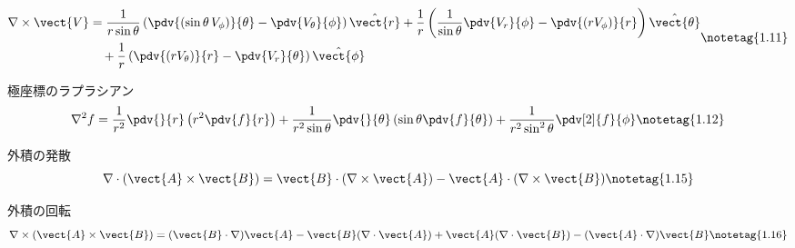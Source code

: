 \documentclass[uplatex,dvipdfmx,a4paper,11pt]{jsarticle}
\begin{document}
\begin{noteshikilist}
    \[ \begin{aligned}
      \nabla\times\vect{V} &= \frac{1}{r\sin\theta}\left(\pdv{(\sin\theta\,V_\phi)}{\theta} - \pdv{V_\theta}{\phi}\right)\hat{\vect{r}} + \frac{1}{r}\left(\frac{1}{\sin\theta}\pdv{V_r}{\phi} - \pdv{(rV_\phi)}{r}\right)\hat{\vect{\theta}} \\
      &\quad + \frac{1}{r}\left(\pdv{(rV_\theta)}{r} - \pdv{V_r}{\theta}\right)\hat{\vect{\phi}}
    \end{aligned} \notetag{1.11} \]
  \item 極座標のラプラシアン %
    \[ \nabla^2 f = \frac{1}{r^2}\pdv{}{r}\left(r^2\pdv{f}{r}\right) + \frac{1}{r^2\sin\theta}\pdv{}{\theta}\left(\sin\theta\pdv{f}{\theta}\right) + \frac{1}{r^2\sin^2\theta}\pdv[2]{f}{\phi} \notetag{1.12} \]
  \item 外積の発散 %
    \[ \nabla\cdot(\vect{A}\times\vect{B}) = \vect{B}\cdot(\nabla\times\vect{A}) - \vect{A}\cdot(\nabla\times\vect{B}) \notetag{1.15} \]
  \item 外積の回転 %
    \[ \nabla\times(\vect{A}\times\vect{B}) = (\vect{B}\cdot\nabla)\vect{A} - \vect{B}(\nabla\cdot\vect{A}) + \vect{A}(\nabla\cdot\vect{B}) - (\vect{A}\cdot\nabla)\vect{B} \notetag{1.16} \]
\end{noteshikilist}
\end{document}
